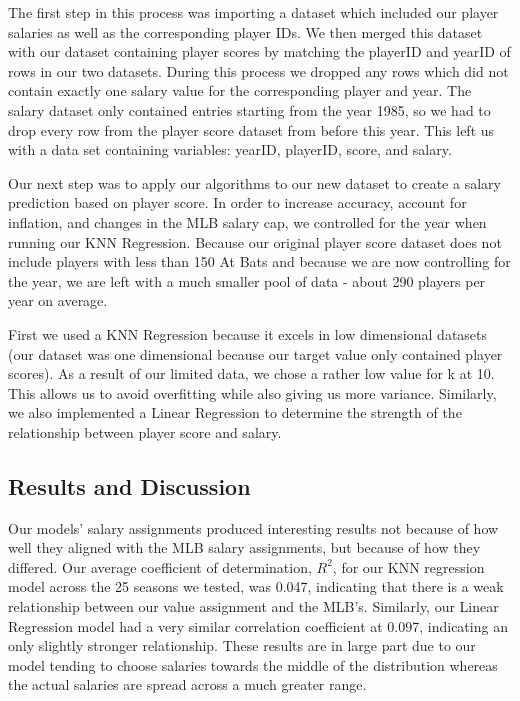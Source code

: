 \documentclass{article}
\begin{document}
	The first step in this process was importing a dataset which included our player salaries as well as the corresponding player IDs. We then merged this dataset with our dataset containing player scores by matching the playerID and yearID of rows in our two datasets. During this process we dropped any rows which did not contain exactly one salary value for the corresponding player and year. The salary dataset only contained entries starting from the year 1985, so we had to drop every row from the player score dataset from before this year. This left us with a data set containing variables: yearID, playerID, score, and salary.
	
	Our next step was to apply our algorithms to our new dataset to create a salary prediction based on player score. In order to increase accuracy, account for inflation, and changes in the MLB salary cap, we controlled for the year when running our KNN Regression. Because our original player score dataset does not include players with less than 150 At Bats and because we are now controlling for the year, we are left with a much smaller pool of data - about 290 players per year on average.
	
    First we used a KNN Regression because it excels in low dimensional datasets (our dataset was one dimensional because our target value only contained player scores). As a result of our limited data, we chose a rather low value for k at 10. This allows us to avoid overfitting while also giving us more variance. Similarly, we also implemented a Linear Regression to determine the strength of the relationship between player score and salary.
    
    \subsection{Results and Discussion}
    \label{results2}
    
    Our models’ salary assignments produced interesting results not because of how well they aligned with the MLB salary assignments, but because of how they differed. Our average coefficient of determination, $R^2$, for our KNN regression model across the 25 seasons we tested, was 0.047, indicating that there is a weak relationship between our value assignment and the MLB’s. Similarly, our Linear Regression model had a very similar correlation coefficient at 0.097, indicating an only slightly stronger relationship. These results are in large part due to our model tending to choose salaries towards the middle of the distribution whereas the actual salaries are spread across a much greater range. 
    
\end{document}
